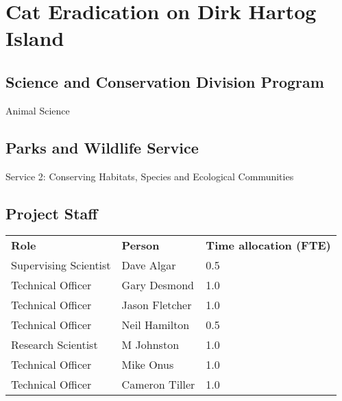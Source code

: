 \documentclass[version=last,
    paper=a4,                               %
    10pt,                                   %
    dvipsnames,
    oneside,                              %
    headings=openany,                       %
    open=any,
    BCOR=7mm,                               %
    DIV=15,     %
]{scrbook}
\begin{document}
\frontmatter
\maketitle
\mainmatter



\section*{Cat Eradication on Dirk Hartog Island
}



\subsection*{Science and Conservation Division Program}

Animal Science




\subsection*{Parks and Wildlife Service}

Service 2: Conserving Habitats, Species and Ecological Communities


\subsection*{Project Staff}
\begin{tabu} {X X X}
\textbf{Role} & \textbf{Person} & \textbf{Time allocation (FTE)}\\

Supervising Scientist & Dave Algar & 0.5\\

Technical Officer & Gary Desmond & 1.0\\

Technical Officer & Jason Fletcher & 1.0\\

Technical Officer & Neil Hamilton & 0.5\\

Research Scientist & M Johnston & 1.0\\

Technical Officer & Mike Onus & 1.0\\

Technical Officer & Cameron Tiller & 1.0\\

\end{tabu}
\end{document}
